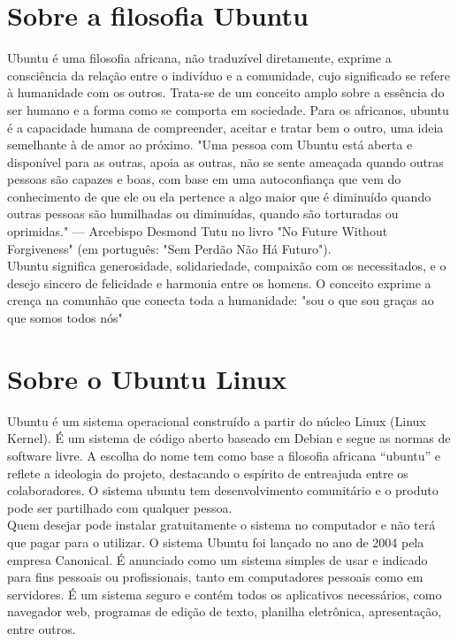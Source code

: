 \documentclass[a4paper,11pt]{book} %
\begin{document}
\section{Sobre a filosofia Ubuntu}
Ubuntu é uma filosofia africana, não traduzível diretamente, exprime a consciência da relação entre o indivíduo e a comunidade, cujo significado se refere à humanidade com os outros. Trata-se de um conceito amplo sobre a essência do ser humano e a forma como se comporta em sociedade. Para os africanos, ubuntu é a capacidade humana de compreender, aceitar e tratar bem o outro, uma ideia semelhante à de amor ao próximo.
"Uma pessoa com Ubuntu está aberta e disponível para as outras, apoia as outras, não se sente ameaçada quando outras pessoas são capazes e boas, com base em uma autoconfiança que vem do conhecimento de que ele ou ela pertence a algo maior que é diminuído quando outras pessoas são humilhadas ou diminuídas, quando são torturadas ou oprimidas." — Arcebispo Desmond Tutu no livro "No Future Without Forgiveness" (em português: "Sem Perdão Não Há Futuro"). \\[3mm]
Ubuntu significa generosidade, solidariedade, compaixão com os necessitados, e o desejo sincero de felicidade e harmonia entre os homens. O conceito exprime a crença na comunhão que conecta toda a humanidade: "sou o que sou graças ao que somos todos nós"
\section{Sobre o Ubuntu Linux}
Ubuntu é um sistema operacional construído a partir do núcleo Linux (Linux Kernel). É um sistema de código aberto baseado em Debian e segue as normas de software livre. A escolha do nome tem como base a filosofia africana “ubuntu” e reflete a ideologia do projeto, destacando o espírito de entreajuda entre os colaboradores. O sistema ubuntu tem desenvolvimento comunitário e o produto pode ser partilhado com qualquer pessoa. \\[3mm]
Quem desejar pode instalar gratuitamente o sistema no computador e não terá que pagar para o utilizar. O sistema Ubuntu foi lançado no ano de 2004 pela empresa Canonical. É anunciado como um sistema simples de usar e indicado para fins pessoais ou profissionais, tanto em computadores pessoais como em servidores. É um sistema seguro e contém todos os aplicativos necessários, como navegador web, programas de edição de texto, planilha eletrônica, apresentação, entre outros.
\end{document}
